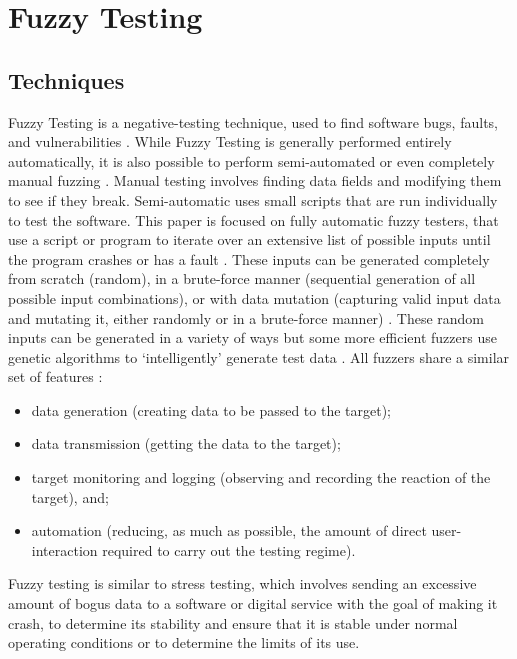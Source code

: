 \documentclass[10pt, final, journal, letterpaper, twoside, twocolumn]{IEEEtran}
\begin{document}
\section{\label{sec:fuzz}Fuzzy Testing}
	\subsection{\label{sec:techniques}Techniques}
		Fuzzy Testing is a negative-testing technique, used to find software bugs, faults, and vulnerabilities \cite{textbook}. While Fuzzy Testing is generally performed entirely automatically, it is also possible to perform semi-automated or even completely manual fuzzing \cite{break-software}. Manual testing involves finding data fields and modifying them to see if they break. Semi-automatic uses small scripts that are run individually to test the software. This paper is focused on fully automatic fuzzy testers, that use a script or program to iterate over an extensive list of possible inputs until the program crashes or has a fault \cite{fuzzing}. These inputs can be generated completely from scratch (random), in a brute-force manner (sequential generation of all possible input combinations), or with data mutation (capturing valid input data and mutating it, either randomly or in a brute-force manner) \cite{clarke}. These random inputs can be generated in a variety of ways but some more efficient fuzzers use genetic algorithms to `intelligently' generate test data \cite{ga}. All fuzzers share a similar set of features \cite{clarke}:
		
		\begin{itemize}
			\item{data generation (creating data to be passed to the target);}
			\item{data transmission (getting the data to the target);}
			\item{target monitoring and logging (observing and recording the reaction of the target), and;}
			\item{automation (reducing, as much as possible, the amount of direct user-interaction required to carry out the testing regime).}
		\end{itemize}
	
	Fuzzy testing is similar to stress testing, which involves sending an excessive amount of bogus data to a software or digital service with the goal of making it crash, to determine its stability and ensure that it is stable under normal operating conditions or to determine the limits of its use.
		
\end{document}
